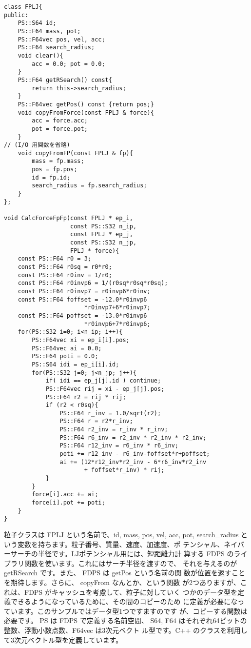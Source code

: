\documentclass[twocolumn,10pt]{jarticle}
\begin{document}
{\scriptsize
\begin{verbatim}
class FPLJ{
public:
    PS::S64 id;
    PS::F64 mass, pot;
    PS::F64vec pos, vel, acc;
    PS::F64 search_radius;
    void clear(){
        acc = 0.0; pot = 0.0;
    }
    PS::F64 getRSearch() const{
        return this->search_radius;
    }
    PS::F64vec getPos() const {return pos;}
    void copyFromForce(const FPLJ & force){
        acc = force.acc;
        pot = force.pot;
    }
// (I/O 用関数を省略)
    void copyFromFP(const FPLJ & fp){ 
        mass = fp.mass;
        pos = fp.pos;
        id = fp.id;
        search_radius = fp.search_radius;
    }
};

void CalcForceFpFp(const FPLJ * ep_i,
                   const PS::S32 n_ip,
                   const FPLJ * ep_j,
                   const PS::S32 n_jp,
                   FPLJ * force){
    const PS::F64 r0 = 3;
    const PS::F64 r0sq = r0*r0;
    const PS::F64 r0inv = 1/r0;
    const PS::F64 r0invp6 = 1/(r0sq*r0sq*r0sq);
    const PS::F64 r0invp7 = r0invp6*r0inv;
    const PS::F64 foffset = -12.0*r0invp6
                       *r0invp7+6*r0invp7;
    const PS::F64 poffset = -13.0*r0invp6
                       *r0invp6+7*r0invp6;
    for(PS::S32 i=0; i<n_ip; i++){
        PS::F64vec xi = ep_i[i].pos;
        PS::F64vec ai = 0.0;
        PS::F64 poti = 0.0;
        PS::S64 idi = ep_i[i].id;
        for(PS::S32 j=0; j<n_jp; j++){
            if( idi == ep_j[j].id ) continue;
            PS::F64vec rij = xi - ep_j[j].pos;
            PS::F64 r2 = rij * rij;
            if (r2 < r0sq){
                PS::F64 r_inv = 1.0/sqrt(r2);
                PS::F64 r = r2*r_inv;
                PS::F64 r2_inv = r_inv * r_inv;
                PS::F64 r6_inv = r2_inv * r2_inv * r2_inv;
                PS::F64 r12_inv = r6_inv * r6_inv;
                poti += r12_inv - r6_inv-foffset*r+poffset;
                ai += (12*r12_inv*r2_inv - 6*r6_inv*r2_inv
                       + foffset*r_inv) * rij;
            }
        }
        force[i].acc += ai;
        force[i].pot += poti;
    }
}
\end{verbatim}
}
粒子クラスは FPLJ という名前で、id, mass, pos, vel, acc, pot,
search\_radius という変数を持ちます。粒子番号、質量、速度、加速度、ポ
テンシャル、ネイバーサーチの半径です。LJポテンシャル用には、短距離力計
算する FDPS のライブラリ関数を使います。これにはサーチ半径を渡すので、
それを与えるのが getRSearch です。また、 FDPS は getPos という名前の関
数が位置を返すことを期待します。さらに、 copyFrom なんとか、という関数
が2つありますが、これは、FDPS がキャッシュを考慮して、粒子に対していく
つかのデータ型を定義できるようになっているために、その間のコピーのため
に定義が必要になっています。このサンプルではデータ型1つですますのです
が、コピーする関数は必要です。 PS は FDPS で定義する名前空間、
S64, F64 はそれぞれ64ビットの整数、浮動小数点数、F64vec は3次元ベクト
ル型です。C++ のクラスを利用して3次元ベクトル型を定義しています。
\end{document}
